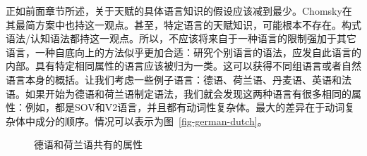 正如前面章节所述，关于天赋的具体语言知识的假设应该减到最少。Chomsky在其最简方案中也持这一观点。甚至，特定语言的天赋知识，可能根本不存在。构式语法/认知语法都持这一观点。所以，不应该将来自于一种语言的限制强加于其它语言，一种自底向上的方法似乎更加合适：研究个别语言的语法，应发自此语言的内部。具有特定相同属性的语言应该被归为一类。这可以获得不同组语言或者自然语言本身的概括。让我们考虑一些例子语言：德语、荷兰语、丹麦语、英语和法语。如果开始为德语和荷兰语制定语法，我们就会发现这两种语言有很多相同的属性：例如，都是SOV和V2语言，并且都有动词性复杂体。最大的差异在于动词复杂体中成分的顺序。情况可以表示为图~\vref{fig-german-dutch}。
\begin{figure}
\centering
{}
\caption{\label{fig-german-dutch}德语和荷兰语共有的属性}
\end{figure}%
